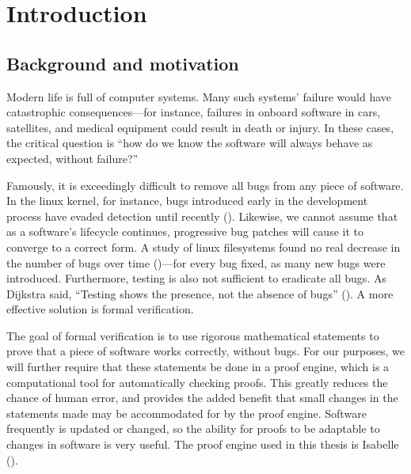 \documentclass[twoside]{memoir}
\begin{document}
\tableofcontents


\mainmatter

\chapter{Introduction}

\section{Background and motivation}

Modern life is full of computer systems.
Many such systems' failure would have catastrophic consequences---for instance,
failures in onboard software in cars, satellites, and medical equipment
could result in death or injury.
In these cases, the critical question is ``how do we know the software
will always behave as expected, without failure?''

Famously, it is exceedingly difficult to remove all bugs
from any piece of software.
In the linux kernel, for instance, bugs
introduced early in the development process
have evaded detection until recently
(\cite{Amlogic2016S905}).
Likewise, we cannot assume that as a software's lifecycle continues,
progressive bug patches will cause it to converge to a correct form.
A study of linux filesystems found no real decrease
in the number of bugs over time (\cite{lu2013study})---for every bug fixed,
as many new bugs were introduced.
Furthermore, testing is also not sufficient to eradicate all bugs.
As Dijkstra said, ``Testing shows the presence, not the absence of bugs''
(\cite{dijkstra-quote}).
A more effective solution is formal verification.

The goal of formal verification is to use rigorous mathematical statements
to prove that a piece of software works correctly, without bugs.
For our purposes, we will further require that these statements be
done in a proof engine, which is a computational tool for 
automatically checking proofs.
This greatly reduces the chance of human error,
and provides the added benefit that small changes in the statements made
may be accommodated for by the proof engine.
Software frequently is updated or changed, so the ability for proofs
to be adaptable to changes in software is very useful.
The proof engine used in this thesis is Isabelle (\cite{wenzel2008isabelle}).
\end{document}
